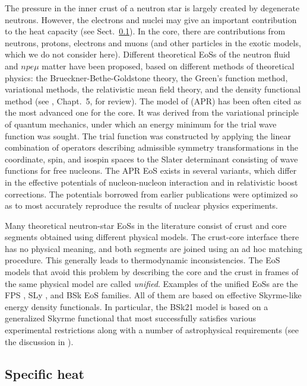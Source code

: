 \documentclass[smallextended]{svjour3}       %
\begin{document}
The pressure in the inner crust of a neutron star is largely
created by degenerate neutrons. However, the electrons and
nuclei may give an important contribution to the heat
capacity (see Sect.~\ref{sect:CV}). In the core, there are
contributions from neutrons, protons, electrons and muons
(and other particles in the exotic models, which we do not
consider here). Different theoretical EoSs of the neutron
fluid and $npe\mu$ matter have been proposed, based on
different methods of theoretical physics: the
Brueckner-Bethe-Goldstone theory, the Green's function
method, variational methods, the relativistic mean field
theory, and the density functional method (see
\citealp{HPY07}, Chapt.~5, for review). The model of
\citet{APR} (APR) has been often cited as the most advanced
one for the core. It was derived from the variational
principle of quantum mechanics, under which an energy
minimum for the trial wave function was sought. The trial
function was constructed by applying the linear combination
of operators describing admissible symmetry transformations
in the coordinate, spin, and isospin spaces to the Slater
determinant consisting of wave functions for free nucleons.
The APR EoS exists in several variants, which differ in the
effective potentials of  nucleon-nucleon interaction and in
relativistic boost corrections. The potentials borrowed from
earlier publications were optimized so as to most accurately
reproduce the results of nuclear physics experiments.

Many theoretical neutron-star EoSs in the literature consist
of crust and core segments obtained using different physical
models. The crust-core interface there has no physical
meaning, and both segments are joined using an ad hoc
matching procedure. This generally leads to thermodynamic
inconsistencies. The EoS models that avoid this problem by
describing the core and the crust in frames of the same
physical model are called \emph{unified}. Examples of the
unified EoSs are the FPS \citep{Pandharipande89,LorenzRP93}, SLy
\citep{DouchinHaensel01}, and BSk
\citep{Goriely-ea10,PearsonGC11,Pearson-ea12} EoS families.
All of them are based on effective Skyrme-like energy
density functionals. In particular, the BSk21 model is based
on a generalized Skyrme functional that most successfully
satisfies various experimental restrictions along with a
number of astrophysical requirements (see the discussion in
\citealp{Potekhin-ea13}). 

\subsection{Specific heat}
\label{sect:CV}
\end{document}
